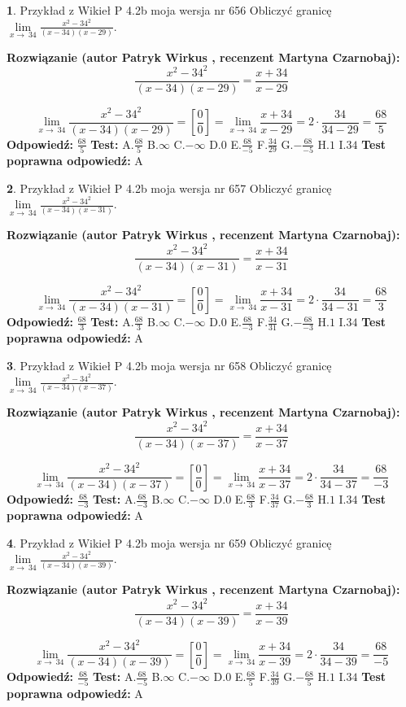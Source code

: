 \documentclass[12pt, a4paper]{article}
\theoremstyle{definition} %
\newtheorem{zad}{}
\newcommand{\zadStart}[1]{\begin{zad}#1\newline}
\newcommand{\zadStop}{\end{zad}}
\newcommand{\rozwStart}[2]{\noindent \textbf{Rozwiązanie (autor #1 , recenzent #2): }\newline}
\newcommand{\rozwStop}{\newline}
\newcommand{\odpStart}{\noindent \textbf{Odpowiedź:}\newline}
\newcommand{\odpStop}{\newline}
\newcommand{\testStart}{\noindent \textbf{Test:}\newline}
\newcommand{\testStop}{\newline}
\newcommand{\kluczStart}{\noindent \textbf{Test poprawna odpowiedź:}\newline}
\newcommand{\kluczStop}{\newline}
\begin{document}
\zadStart{Przykład z Wikieł P 4.2b moja wersja nr 656}
Obliczyć granicę $\lim\limits_{x\to\ 34}\frac{x^{2}-34^{2}}{(x-34)(x-29)}$.
\zadStop
\rozwStart{Patryk Wirkus}{Martyna Czarnobaj}
$$\frac{x^{2}-34^{2}}{(x-34)(x-29)}=\frac{x+34}{x-29}$$

$$\lim\limits_{x\to\ 34}\frac{x^{2}-34^{2}}{(x-34)(x-29)}=[\frac{0}{0}]=\lim\limits_{x\to\ 34}\frac{x+34}{x-29}=2 \cdot \frac{34}{34-29} = \frac{68}{5}$$
\rozwStop
\odpStart
$\frac{68}{5}$
\odpStop
\testStart
A.$\frac{68}{5}$
B.$\infty$
C.$-\infty$
D.$0$
E.$\frac{68}{-5}$
F.$\frac{34}{29}$
G.$-\frac{68}{-5}$
H.$1$
I.$34$
\testStop
\kluczStart
A
\kluczStop



\zadStart{Przykład z Wikieł P 4.2b moja wersja nr 657}
Obliczyć granicę $\lim\limits_{x\to\ 34}\frac{x^{2}-34^{2}}{(x-34)(x-31)}$.
\zadStop
\rozwStart{Patryk Wirkus}{Martyna Czarnobaj}
$$\frac{x^{2}-34^{2}}{(x-34)(x-31)}=\frac{x+34}{x-31}$$

$$\lim\limits_{x\to\ 34}\frac{x^{2}-34^{2}}{(x-34)(x-31)}=[\frac{0}{0}]=\lim\limits_{x\to\ 34}\frac{x+34}{x-31}=2 \cdot \frac{34}{34-31} = \frac{68}{3}$$
\rozwStop
\odpStart
$\frac{68}{3}$
\odpStop
\testStart
A.$\frac{68}{3}$
B.$\infty$
C.$-\infty$
D.$0$
E.$\frac{68}{-3}$
F.$\frac{34}{31}$
G.$-\frac{68}{-3}$
H.$1$
I.$34$
\testStop
\kluczStart
A
\kluczStop



\zadStart{Przykład z Wikieł P 4.2b moja wersja nr 658}
Obliczyć granicę $\lim\limits_{x\to\ 34}\frac{x^{2}-34^{2}}{(x-34)(x-37)}$.
\zadStop
\rozwStart{Patryk Wirkus}{Martyna Czarnobaj}
$$\frac{x^{2}-34^{2}}{(x-34)(x-37)}=\frac{x+34}{x-37}$$

$$\lim\limits_{x\to\ 34}\frac{x^{2}-34^{2}}{(x-34)(x-37)}=[\frac{0}{0}]=\lim\limits_{x\to\ 34}\frac{x+34}{x-37}=2 \cdot \frac{34}{34-37} = \frac{68}{-3}$$
\rozwStop
\odpStart
$\frac{68}{-3}$
\odpStop
\testStart
A.$\frac{68}{-3}$
B.$\infty$
C.$-\infty$
D.$0$
E.$\frac{68}{3}$
F.$\frac{34}{37}$
G.$-\frac{68}{3}$
H.$1$
I.$34$
\testStop
\kluczStart
A
\kluczStop



\zadStart{Przykład z Wikieł P 4.2b moja wersja nr 659}
Obliczyć granicę $\lim\limits_{x\to\ 34}\frac{x^{2}-34^{2}}{(x-34)(x-39)}$.
\zadStop
\rozwStart{Patryk Wirkus}{Martyna Czarnobaj}
$$\frac{x^{2}-34^{2}}{(x-34)(x-39)}=\frac{x+34}{x-39}$$

$$\lim\limits_{x\to\ 34}\frac{x^{2}-34^{2}}{(x-34)(x-39)}=[\frac{0}{0}]=\lim\limits_{x\to\ 34}\frac{x+34}{x-39}=2 \cdot \frac{34}{34-39} = \frac{68}{-5}$$
\rozwStop
\odpStart
$\frac{68}{-5}$
\odpStop
\testStart
A.$\frac{68}{-5}$
B.$\infty$
C.$-\infty$
D.$0$
E.$\frac{68}{5}$
F.$\frac{34}{39}$
G.$-\frac{68}{5}$
H.$1$
I.$34$
\testStop
\kluczStart
A
\kluczStop
\end{document}
